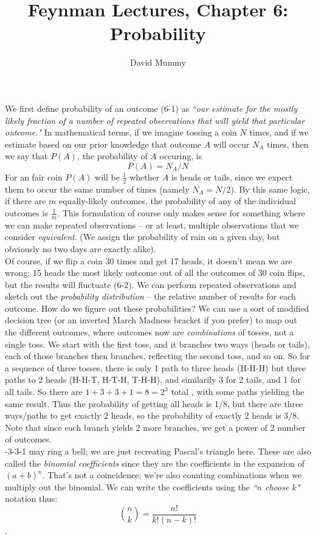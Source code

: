 \documentclass[10pt,letterpaper]{article}
\author{David Mummy}
\title{Feynman Lectures, Chapter 6: Probability}
\begin{document}
\maketitle
We first define probability of an outcome (6-1) as \textit{``our estimate for the mostly likely fraction of a number of repeated observations that will yield that particular outcome."} In mathematical terms, if we imagine tossing a coin $N$ times, and if we estimate based on our prior knowledge that outcome $A$ will occur $N_A$ times, then we say that $P(A)$, the probability of $A$ occuring, is
$$ 
P(A) = N_A/N
$$
For an fair coin $P(A)$ will be $\frac{1}{2}$ whether $A$ is heads or tails, since we expect them to occur the same number of times (namely $N_A = N/2$). By this same logic, if there are $m$ equally-likely outcomes, the probability of any of the individual outcomes is $\frac{1}{m}$. This formulation of course only makes sense for something where we can make repeated observations -- or at least, multiple observations that we consider \textit{equivalent}. (We assign the probability of rain on a given day, but obviously no two days are exactly alike). \\
\indent Of course, if we flip a coin 30 times and get 17 heads, it doesn't mean we are wrong; 15 heads the most likely outcome out of all the outcomes of 30 coin flips, but the results will fluctuate (6-2). We can perform repeated observations and sketch out the \textit{probability distribution} -- the relative number of results for each outcome. How do we figure out these probabilities? We can use a sort of modified decision tree (or an inverted March Madness bracket if you prefer) to map out the different outcomes, where outcomes now are \textit{combinations} of tosses, not a single toss. We start with the first toss, and it branches two ways (heads or tails), each of those branches then branches, reflecting the second toss, and so on. So for a sequence of three tosses, there is only 1 path to three heads (H-H-H) but three paths to 2 heads (H-H-T, H-T-H, T-H-H), and similarily 3 for 2 tails, and 1 for all tails. So there are $1+3+3+1 = 8 =2^3$ total , with some paths yielding the same result. Thus the probability of getting all heads is 1/8, but there are three ways/paths to get exactly 2 heads, so the probability of exactly 2 heads is $3/8$. Note that since each branch yields 2 more branches, we get a power of 2 number of outcomes. \\
-3-3-1 may ring a bell; we are just recreating Pascal's triangle here. These are also called the \textit{binomial coefficients} since they are the coefficients in the expansion of $(a+b)^n$. That's not a coincidence; we're also counting combinations when we multiply out the binomial. We can write the coefficients using the \textit{``$n$ choose $k$"} notation thus: 
$$ {{n}\choose{k}} = \frac{n!}{k!(n-k)!}$$.
\end{document}
